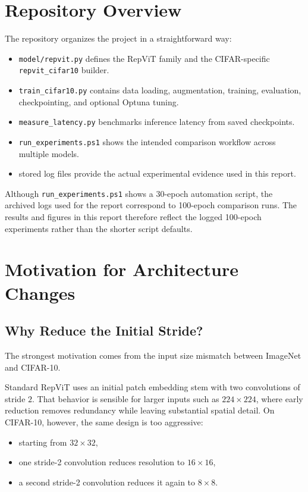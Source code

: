 \documentclass[11pt,a4paper]{article}
\begin{document}
\section{Repository Overview}

The repository organizes the project in a straightforward way:
\begin{itemize}[leftmargin=1.5em]
    \item \texttt{model/repvit.py} defines the RepViT family and the CIFAR-specific \texttt{repvit\_cifar10} builder.
    \item \texttt{train\_cifar10.py} contains data loading, augmentation, training, evaluation, checkpointing, and optional Optuna tuning.
    \item \texttt{measure\_latency.py} benchmarks inference latency from saved checkpoints.
    \item \texttt{run\_experiments.ps1} shows the intended comparison workflow across multiple models.
    \item stored log files provide the actual experimental evidence used in this report.
\end{itemize}

Although \texttt{run\_experiments.ps1} shows a 30-epoch automation script, the archived logs used for the report correspond to 100-epoch comparison runs. The results and figures in this report therefore reflect the logged 100-epoch experiments rather than the shorter script defaults.

\section{Motivation for Architecture Changes}

\subsection{Why Reduce the Initial Stride?}

The strongest motivation comes from the input size mismatch between ImageNet and CIFAR-10.

Standard RepViT uses an initial patch embedding stem with two convolutions of stride \(2\). That behavior is sensible for larger inputs such as \(224 \times 224\), where early reduction removes redundancy while leaving substantial spatial detail. On CIFAR-10, however, the same design is too aggressive:
\begin{itemize}[leftmargin=1.5em]
    \item starting from \(32 \times 32\),
    \item one stride-2 convolution reduces resolution to \(16 \times 16\),
    \item a second stride-2 convolution reduces it again to \(8 \times 8\).
\end{itemize}
\end{document}
